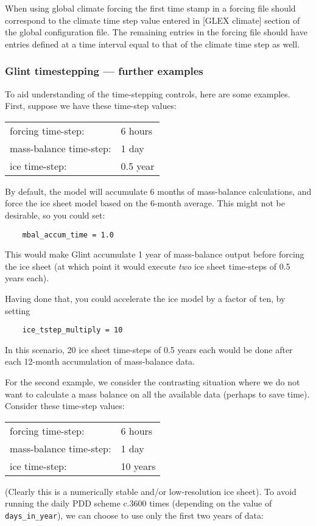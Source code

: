 When using global climate forcing the first time stamp in a forcing file should correspond to the 
climate time step value entered in [GLEX climate] section of the global configuration file. The remaining entries 
in the forcing file should have entries defined at a time interval equal to that of the climate time step as well.


\subsubsection{Glint timestepping --- further examples}

To aid understanding of the time-stepping controls, here are some examples. First, suppose we have these time-step values:

\vspace{0.5cm}
\begin{tabular}{ll}
forcing time-step: & 6 hours \\
mass-balance time-step: & 1 day \\
ice time-step: & 0.5 year \\
\end{tabular}
\vspace{0.5cm}
%
\newline
By default, the model will accumulate 6 months of mass-balance 
calculations, and force the ice sheet model based on the 6-month average. This might not be 
desirable, so you could set:
%
\begin{verbatim}
    mbal_accum_time = 1.0
\end{verbatim}
%
This would make Glint accumulate 1 year of mass-balance output before 
forcing the ice sheet (at which point it would execute \emph{two} ice sheet 
time-steps of 0.5 years each).

Having done that, you could accelerate the ice model by a factor of ten, by 
setting

\begin{verbatim}
    ice_tstep_multiply = 10
\end{verbatim}
%
In this scenario, 20 ice sheet time-steps of 0.5 years each would be done 
after each 12-month accumulation of mass-balance data.

For the second example, we consider the contrasting situation where we do not want to calculate a 
mass balance on all the available data (perhaps to save time). Consider 
these time-step values:

\vspace{0.5cm}
\begin{tabular}{ll}
forcing time-step:   &   6 hours \\
mass-balance time-step: & 1 day \\
ice time-step:       &   10 years\\
\end{tabular}
\vspace{0.5cm}
%
\newline
(Clearly this is a numerically stable and/or low-resolution ice sheet).
To avoid running the daily PDD scheme c.3600 times (depending on the value of 
\texttt{days\_in\_year}), we can choose to use only the first two years of data:

